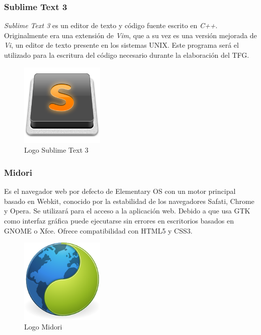 		\subsubsection{Sublime Text 3}
		\textit{Sublime Text 3} es un editor de texto y código fuente escrito en \textit{C++}. Originalmente era una extensión de \textit{Vim}, que a su vez es una versión mejorada de \textit{Vi}, un editor de texto presente en los sistemas UNIX.
		Este programa será el utilizado para la escritura del código necesario durante la elaboración del \ac{TFG}.
		
		\begin{figure}[H]
		\centering
		\includegraphics[width=40mm, fbox={\fboxrule} 4mm]{images/04-metodo/29-sublime_text_logo.png}
		\caption{Logo Sublime Text 3}
		\label{fig:sublime-text-logo}
		\end{figure}
		
		\subsubsection{Midori}
		Es el navegador web por defecto de Elementary OS con un motor principal basado en Webkit, conocido por la estabilidad de los navegadores Safati, Chrome y Opera. Se utilizará para el acceso a la aplicación web. Debido a que usa \ac{GTK} como interfaz gráfica puede ejecutarse sin errores en escritorios basados en \ac{GNOME} o Xfce.
		Ofrece compatibilidad con HTML5 y CSS3.
		
		\begin{figure}[H]
		\centering
		\includegraphics[width=40mm, fbox={\fboxrule} 4mm]{images/04-metodo/30-midori_logo.png}
		\caption{Logo Midori}
		\label{fig:midori-logo}
		\end{figure}
		

